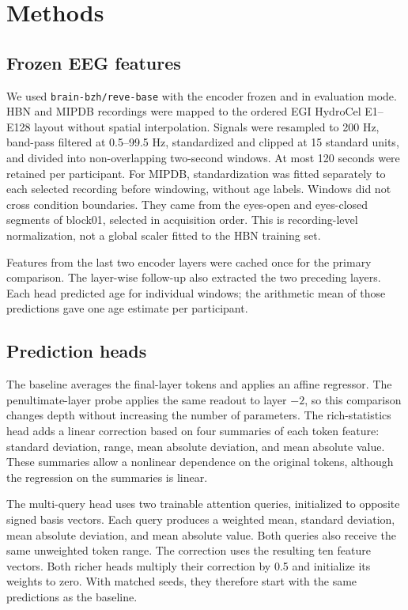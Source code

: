 \section{Methods}

\subsection{Frozen EEG features}
We used \texttt{brain-bzh/reve-base} with the encoder frozen and in evaluation
mode. HBN and MIPDB recordings were mapped to the ordered EGI HydroCel E1--E128
layout without spatial interpolation. Signals were resampled to 200 Hz,
band-pass filtered at 0.5--99.5 Hz, standardized and clipped at 15 standard
units, and divided into non-overlapping two-second windows. At most 120 seconds
were retained per participant. For MIPDB, standardization was fitted separately
to each selected recording before windowing, without age labels. Windows did
not cross condition boundaries. They came from the eyes-open and eyes-closed
segments of block01, selected in acquisition order. This is recording-level
normalization, not a global scaler fitted to the HBN training set.

Features from the last two encoder layers were cached once for the primary
comparison. The layer-wise follow-up also extracted the two preceding layers.
Each head predicted age for individual windows; the arithmetic mean of those
predictions gave one age estimate per participant.

\subsection{Prediction heads}
The baseline averages the final-layer tokens and applies an affine regressor.
The penultimate-layer probe applies the same readout to layer $-2$, so this
comparison changes depth without increasing the number of parameters.
The rich-statistics head adds a linear correction based on four summaries of
each token feature: standard deviation, range, mean absolute deviation, and
mean absolute value. These summaries allow a nonlinear dependence on the
original tokens, although the regression on the summaries is linear.

The multi-query head uses two trainable attention queries, initialized to
opposite signed basis vectors. Each query produces a weighted mean, standard
deviation, mean absolute deviation, and mean absolute value. Both queries also
receive the same unweighted token range. The correction uses the resulting ten
feature vectors. Both richer heads multiply their correction by 0.5 and
initialize its weights to zero. With matched seeds, they therefore start with
the same predictions as the baseline.

